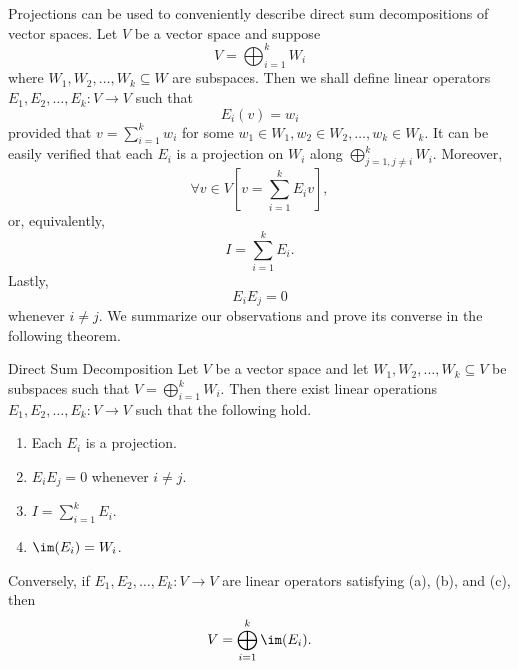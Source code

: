 \documentclass[linearalgebraII]{subfiles}
\begin{document}
    \begin{remark}
        Projections can be used to conveniently describe direct sum decompositions of vector spaces. Let $V$ be a vector space and suppose
        \begin{equation*}
            V = \bigoplus^{k}_{i=1} W_i
        \end{equation*}
        where $W_1, W_2, \ldots, W_k\subseteq W$ are subspaces. Then we shall define linear operators $E_1, E_2, \ldots, E_k:V\to V$ such that
        \begin{equation*}
            E_i(v) = w_i
        \end{equation*}
        provided that $v = \sum^{k}_{i=1} w_i$ for some $w_1\in W_1, w_2\in W_2, \ldots, w_k\in W_k$. It can be easily verified that each $E_i$ is a projection on $W_i$ along $\bigoplus^{k}_{j=1, j\neq i} W_i$. Moreover,
        \begin{equation*}
            \forall v\in V \left[ v = \sum^{k}_{i=1} E_iv \right],
        \end{equation*}
        or, equivalently,
        \begin{equation*}
            I = \sum^{k}_{i=1} E_i. 
        \end{equation*}
        Lastly,
        \begin{equation*}
            E_iE_j = 0
        \end{equation*}
        whenever $i\neq j$. We summarize our observations and prove its converse in the following theorem.
    \end{remark}

    \clearpage
    \begin{theorem}{Direct Sum Decomposition}
        Let $V$ be a vector space and let $W_1, W_2, \ldots, W_k\subseteq V$ be subspaces such that $V = \bigoplus^{k}_{i=1} W_i$. Then there exist linear operations $E_1, E_2, \ldots, E_k:V\to V$ such that the following hold.
        \begin{enumerate}
            \item Each $E_i$ is a projection.
            \item $E_iE_j = 0$ whenever $i\neq j$. 
            \item $I = \sum^{k}_{i=1} E_i$.
            \item $\im(E_i) = W_i$.
        \end{enumerate}
        Conversely, if $E_1, E_2, \ldots, E_k:V\to V$ are linear operators satisfying (a), (b), and (c), then
        \begin{equation*}
            V = \bigoplus^{k}_{i=1} \im(E_i).
        \end{equation*}
    \end{theorem}
\end{document}
